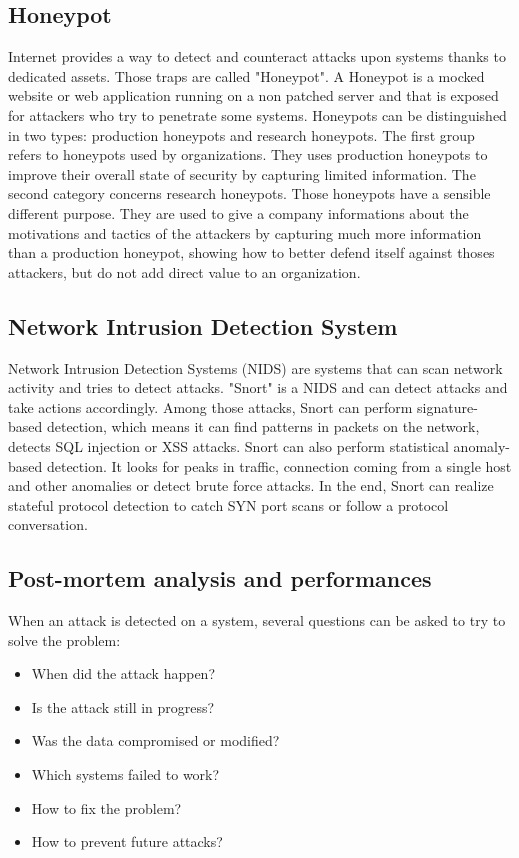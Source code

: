 \subsection{Honeypot}
Internet provides a way to detect and counteract attacks upon systems thanks to
dedicated assets. Those traps are called "Honeypot". A Honeypot is a mocked
website or web application running on a non patched server and that is exposed
for attackers who try to penetrate some systems. Honeypots can be distinguished
in two types: production honeypots and research honeypots. The first group
refers to honeypots used by organizations. They uses production honeypots to
improve their overall state of security by capturing limited information. The
second category concerns research honeypots. Those honeypots have a sensible
different purpose. They are used to give a company informations about the
motivations and tactics of the attackers by capturing much more information than
a production honeypot, showing how to better defend itself against thoses
attackers, but do not add direct value to an organization.

\subsection{Network Intrusion Detection System}
Network Intrusion Detection Systems (NIDS) are systems that can scan network
activity and tries to detect attacks. "Snort" is a NIDS and can detect attacks
and take actions accordingly. Among those attacks, Snort can perform
signature-based detection, which means it can find patterns in packets on the
network, detects SQL injection or XSS attacks. Snort can also perform
statistical anomaly-based detection. It looks for peaks in traffic, connection
coming from a single host and other anomalies or detect brute force attacks. In
the end, Snort can realize stateful protocol detection to catch SYN port scans
or follow a protocol conversation.

\subsection{Post-mortem analysis and performances}
When an attack is detected on a system, several questions can be asked to try
to solve the problem:
\begin{itemize}
\item When did the attack happen?
\item Is the attack still in progress?
\item Was the data compromised or modified?
\item Which systems failed to work?
\item How to fix the problem?
\item How to prevent future attacks?
\end{itemize}

